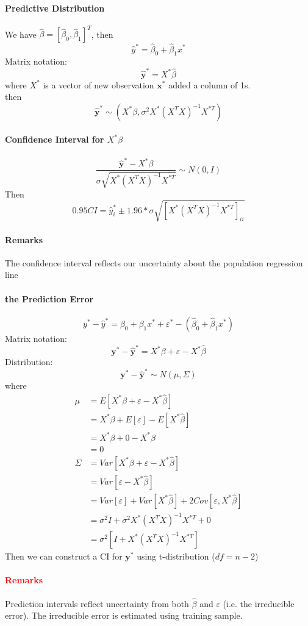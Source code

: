 \documentclass[11pt]{article}
\newcommand{\tb}[1]{\textbf{#1}}
\newcommand{\vx}[0]{\tb{x}}
\newcommand{\vy}[0]{\tb{y}}
\begin{document}
\paragraph{Predictive Distribution}
We have $\hat{\beta} = [\hat{\beta}_0, \hat{\beta}_1]^T$, then
$$\hat{y}^* = \hat{\beta}_0 + \hat{\beta}_1x^*$$
Matrix notation:
$$\hat{\vy}^* = X^*\hat{\beta}$$
where $X^*$ is a vector of new observation $\vx^*$ added a column of 1s. \\
then
$$\hat{\vy}^* \sim (X^*\beta, \sigma^2X^*(X^TX)^{-1}X^{*T})$$
\paragraph{Confidence Interval for $X^*\beta$}
$$\frac{\hat{\vy}^*-X^*\beta}{\sigma\sqrt{X^*(X^TX)^{-1}X^{*T}}} \sim N(0,I)$$
Then $$0.95 CI = \hat{y}^*_i \pm 1.96 * \sigma \sqrt{[X^*(X^TX)^{-1}X^{*T}]_{ii}}$$
\paragraph{Remarks}
The confidence interval reflects our uncertainty about the population regression line
\paragraph{the Prediction Error}
$$y^* - \hat{y}^* = \beta_0 + \beta_1x^* + \varepsilon^* - (\hat{\beta}_0 + \hat{\beta}_1x^*)$$
Matrix notation:
$$\vy^* - \hat{\vy}^* = X^*\beta + \varepsilon - X^*\hat{\beta}$$
Distribution:
$$\vy^* - \hat{\vy}^* \sim N(\mu, \Sigma)$$ where
\begin{align*}
    \mu &= E[X^*\beta + \varepsilon - X^*\hat{\beta}]\\
    &= X^*\beta + E[\varepsilon] - E[X^*\hat{\beta}]\\
    &= X^*\beta + 0 - X^*\beta \\
    &= 0 \\
    \Sigma &= Var[X^*\beta + \varepsilon - X^*\hat{\beta}] \\
    &= Var[\varepsilon - X^*\hat{\beta}]\\
    &= Var[\varepsilon] + Var[X^*\hat{\beta}] + 2Cov[\varepsilon, X^*\hat{\beta}] \\
    &= \sigma^2I + \sigma^2X^*(X^TX)^{-1}X^{*T} + 0\\
    &= \sigma^2[I + X^*(X^TX)^{-1}X^{*T}]
\end{align*}
Then we can construct a CI for $\vy^*$ using t-distribution ($df = n-2$)
\paragraph{\textcolor{red}{Remarks}}
Prediction intervals reflect uncertainty from both $\hat{\beta}$ and $\varepsilon$ (i.e. the irreducible error). The irreducible error is estimated using training sample.
\end{document}
